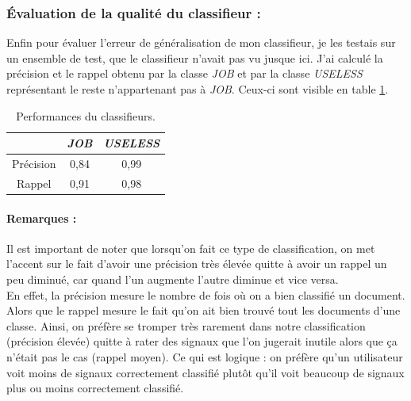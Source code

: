             \subsubsection{Évaluation de la qualité du classifieur :}
                Enfin pour évaluer l'erreur de généralisation de mon classifieur, je les testais sur un ensemble de test, que le classifieur n'avait pas \og vu \fg jusque ici. J'ai calculé la précision et le rappel obtenu par la classe \textit{JOB} et par la classe \textit{USELESS} représentant le reste n'appartenant pas à \textit{JOB}. Ceux-ci sont visible en table \ref{tab:classif_perf}.
                \begin{table}[h]
                    \centering
                    \begin{tabular}{| c | c | c |}
                        \hline
                         & \textit{JOB} & \textit{USELESS} \\
                        \hline
                        Précision & 0,84 & 0,99 \\
                        Rappel & 0,91 & 0,98 \\
                        \hline
                    \end{tabular}
                    \caption{Performances du classifieurs.}
                    \label{tab:classif_perf}
                \end{table}

            \paragraph{Remarques :}
                Il est important de noter que lorsqu'on fait ce type de classification, on met l'accent sur le fait d'avoir une précision très élevée quitte à avoir un rappel un peu diminué, car quand l'un augmente l'autre diminue et vice versa.\\

                En effet, la précision mesure le nombre de fois où on a bien classifié un document. Alors que le rappel mesure le fait qu'on ait bien trouvé tout les documents d'une classe. Ainsi, on préfère se tromper très rarement dans notre classification (précision élevée) quitte à rater des signaux que l'on jugerait inutile alors que ça n'était pas le cas (rappel moyen). Ce qui est logique : on préfère qu'un utilisateur voit moins de signaux correctement classifié plutôt qu'il voit beaucoup de signaux plus ou moins correctement classifié.

